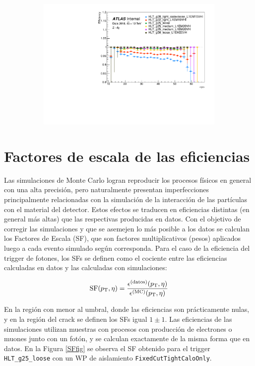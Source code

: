 \begin{figure}
\begin{subfigure}[b]{0.32\textwidth}
		\includegraphics[width=\textwidth]{images/2018_eff_mu_zoom.pdf}
	\end{subfigure}

	\label{trigEff}

\end{figure}


\section{Factores de escala de las eficiencias}

Las simulaciones de Monte Carlo logran reproducir los procesos físicos en general con una alta precisión, pero naturalmente presentan imperfecciones principalmente relacionadas con la simulación de la interacción de las partículas con el material del detector. Estos efectos se traducen en eficiencias distintas (en general más altas) que las respectivas producidas en datos. Con el objetivo de corregir las simulaciones y que se asemejen lo más posible a los datos se calculan los Factores de Escala (SF), que son factores multiplicativos (pesos) aplicados luego a cada evento simulado según corresponda. Para el caso de la eficiencia del trigger de fotones, los SFs se definen como el cociente entre las eficiencias calculadas en datos y las calculadas con simulaciones:

\begin{equation}
	\text{SF}(p_{\text{T}}, \eta) = \frac{\epsilon^{\text{(datos)}}(p_{\text{T}}, \eta)}{\epsilon^{\text{(MC)}}(p_{\text{T}}, \eta)}
\end{equation}

En la región con \pt menor al umbral, donde las eficiencias son prácticamente nulas, y en la región del crack se definen los SFs igual $1\pm1$. Las eficiencias de las simulaciones utilizan muestras con procesos con producción de electrones o muones junto con un fotón, y se calculan exactamente de la misma forma que en datos. En la Figura \ref{SFfig} se observa el SF obtenido para el trigger \texttt{HLT\_g25\_loose} con un WP de aislamiento \texttt{FixedCutTightCaloOnly}. 


